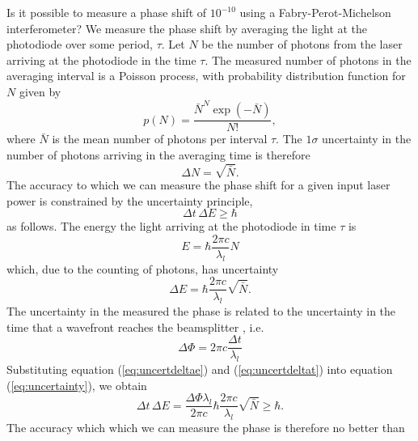 Is it possible to measure a phase shift of $10^{-10}$ using a
Fabry-Perot-Michelson interferometer? We measure the phase shift by averaging
the light at the photodiode over some period, $\tau$. Let $N$ be the number of
photons from the laser arriving at the photodiode in the time $\tau$. The
measured number of photons in the averaging interval is a Poisson process,
with probability distribution function for $N$ given by
\begin{equation}
p(N) = \frac{ \bar{N} ^{N} \exp \left(-\bar{N}\right) } {N!},
\end{equation}
where $\bar{N}$ is the mean number of photons per interval $\tau$.
The $1\sigma$ uncertainty in the number of photons arriving in the averaging
time is therefore
\begin{equation}
\Delta N = \sqrt{\bar{N}}.
\end{equation}
The accuracy to which we can measure the phase shift for a given input
laser power is constrained by the uncertainty principle,
\begin{equation}
\Delta t \, \Delta E \ge \hbar
\label{eq:uncertainty}
\end{equation}
as follows. The energy the light arriving at the photodiode in time $\tau$ is
\begin{equation}
E = \hbar \frac{2\pi c}{\lambda_l} N
\end{equation}
which, due to the counting of photons, has uncertainty 
\begin{equation}
\Delta E = \hbar \frac{2\pi c}{\lambda_l} \sqrt{\bar{N}}.
\label{eq:uncertdeltae}
\end{equation}
The uncertainty in the measured the phase is related to the uncertainty
in the time that a wavefront reaches the beamsplitter , i.e.
\begin{equation}
\Delta\Phi = 2\pi c \frac{\Delta t }{ \lambda_l }
\label{eq:uncertdeltat}
\end{equation}
Substituting equation (\ref{eq:uncertdeltae}) and (\ref{eq:uncertdeltat})
into equation (\ref{eq:uncertainty}), we obtain
\begin{equation}
\Delta t \, \Delta E = \frac{\Delta \Phi \lambda_l}{2\pi c} \hbar \frac{2\pi
c}{\lambda_l} \sqrt{\bar{N}} \ge \hbar.
\end{equation}
The accuracy which which we can measure the phase is therefore no better than
